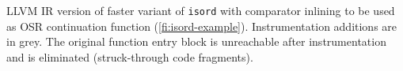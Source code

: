\label{fig:isordascto} LLVM IR version of faster variant of {\tt isord} with comparator inlining to be used as OSR continuation function (\myfigure\ref{fi:isord-example}). Instrumentation additions are in grey. The original function entry block is unreachable after instrumentation and is eliminated (struck-through code fragments).